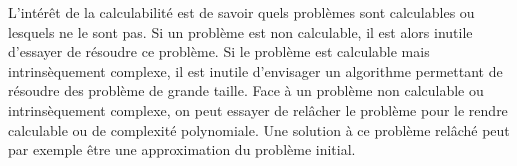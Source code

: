 L'intérêt de la calculabilité est de savoir quels problèmes sont calculables ou lesquels ne le sont pas.  Si un problème est non calculable, il est alors inutile  d'essayer de résoudre ce problème.  Si le problème est calculable mais intrinsèquement complexe, il est inutile d'envisager un algorithme permettant de résoudre des problème de grande taille.
Face à un problème non calculable ou intrinsèquement complexe,  on peut essayer de relâcher le problème pour le rendre calculable ou de complexité polynomiale.  Une solution à ce problème relâché peut par exemple être une approximation du problème initial.
